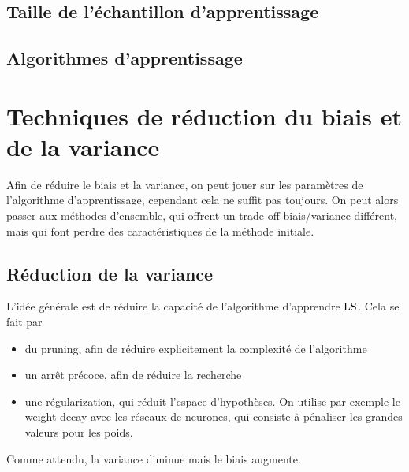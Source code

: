 		
		\subsection{Taille de l'échantillon d'apprentissage}
		
		
		\subsection{Algorithmes d'apprentissage}
		
		
	\section{Techniques de réduction du biais et de la variance}
	
	Afin de réduire le biais et la variance, on peut jouer sur les paramètres de l'algorithme d'apprentissage, cependant cela ne suffit pas toujours. On peut alors passer aux méthodes d'ensemble, qui offrent un trade-off biais/variance différent, mais qui font perdre des caractéristiques de la méthode initiale.
	
		\subsection{Réduction de la variance}
		
		L'idée générale est de réduire la capacité de l'algorithme d'apprendre $\text{LS}$. Cela se fait par
		
		\begin{itemize}
			\item du pruning, afin de réduire explicitement la complexité de l'algorithme
			\item un arrêt précoce, afin de réduire la recherche
			\item une régularization, qui réduit l'espace d'hypothèses. On utilise par exemple le weight decay avec les réseaux de neurones, qui consiste à pénaliser les grandes valeurs pour les poids.
		\end{itemize}
		
		
		
		Comme attendu, la variance diminue mais le biais augmente.